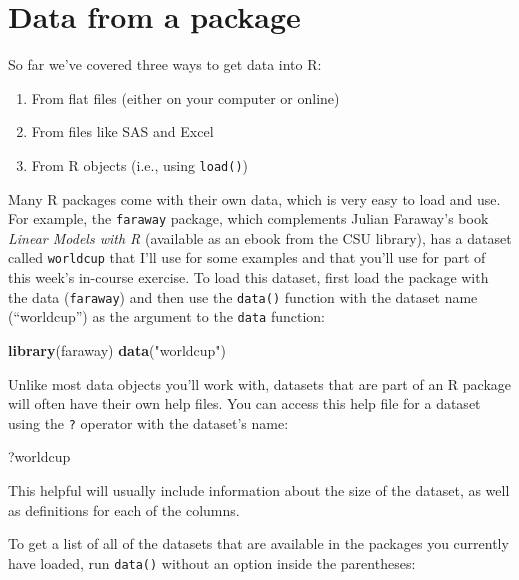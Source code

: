 \documentclass[]{book}
\makeatletter
\newenvironment{Shaded}{\begin{snugshade}}{\end{snugshade}}
\newcommand{\KeywordTok}[1]{\textcolor[rgb]{0.13,0.29,0.53}{\textbf{#1}}}
\newcommand{\StringTok}[1]{\textcolor[rgb]{0.31,0.60,0.02}{#1}}
\newcommand{\NormalTok}[1]{#1}
\providecommand{\tightlist}{%
  \setlength{\itemsep}{0pt}\setlength{\parskip}{0pt}}
\newenvironment{kframe}{%
\medskip{}
\setlength{\fboxsep}{.8em}
 \def\at@end@of@kframe{}%
 \ifinner\ifhmode%
  \def\at@end@of@kframe{\end{minipage}}%
  \begin{minipage}{\columnwidth}%
 \fi\fi%
 \def\FrameCommand##1{\hskip\@totalleftmargin \hskip-\fboxsep
 \colorbox{shadecolor}{##1}\hskip-\fboxsep
     \hskip-\linewidth \hskip-\@totalleftmargin \hskip\columnwidth}%
 \MakeFramed {\advance\hsize-\width
   \@totalleftmargin\z@ \linewidth\hsize
   \@setminipage}}%
 {\par\unskip\endMakeFramed%
 \at@end@of@kframe}
\renewenvironment{Shaded}{\begin{kframe}}{\end{kframe}}
\theoremstyle{definition}
\theoremstyle{definition}
\theoremstyle{definition}
\theoremstyle{remark}
\makeatother
\begin{document}
\section{Data from a package}\label{data-from-a-package}

So far we've covered three ways to get data into R:

\begin{enumerate}
\def\labelenumi{\arabic{enumi}.}
\tightlist
\item
  From flat files (either on your computer or online)
\item
  From files like SAS and Excel
\item
  From R objects (i.e., using \texttt{load()})
\end{enumerate}

Many R packages come with their own data, which is very easy to load and
use. For example, the \texttt{faraway} package, which complements Julian
Faraway's book \emph{Linear Models with R} (available as an ebook from
the CSU library), has a dataset called \texttt{worldcup} that I'll use
for some examples and that you'll use for part of this week's in-course
exercise. To load this dataset, first load the package with the data
(\texttt{faraway}) and then use the \texttt{data()} function with the
dataset name (``worldcup'') as the argument to the \texttt{data}
function:

\begin{Shaded}
\begin{Highlighting}[]
\KeywordTok{library}\NormalTok{(faraway)}
\KeywordTok{data}\NormalTok{(}\StringTok{"worldcup"}\NormalTok{)}
\end{Highlighting}
\end{Shaded}

Unlike most data objects you'll work with, datasets that are part of an
R package will often have their own help files. You can access this help
file for a dataset using the \texttt{?} operator with the dataset's
name:

\begin{Shaded}
\begin{Highlighting}[]
\NormalTok{?worldcup}
\end{Highlighting}
\end{Shaded}

This helpful will usually include information about the size of the
dataset, as well as definitions for each of the columns.

To get a list of all of the datasets that are available in the packages
you currently have loaded, run \texttt{data()} without an option inside
the parentheses:
\end{document}
